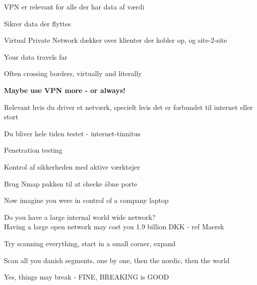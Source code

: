 \documentclass[Screen16to9,17pt]{foils}
\begin{document}


\begin{list2}
\item VPN er relevant for alle der har data af værdi
\item Sikrer data der flyttes
\item Virtual Private Network dækker over klienter der kobler op, og site-2-site
\end{list2}




\begin{list2}
\item Your data travels far
\item Often crossing borders, virtually and literally
\end{list2}

\vskip 5mm
\centerline{\bf\Large Maybe use VPN more - or always!}




\begin{list2}
\item Relevant hvis du driver et netværk, specielt hvis det er forbundet til internet eller stort
\item Du bliver hele tiden testet - internet-tinnitus
\item Penetration testing
\item Kontrol af sikkerheden med aktive værktøjer
\item Brug Nmap pakken til at checke åbne porte
\end{list2}




\begin{list2}
\item Now imagine you were in control of a company laptop
\item Do you have a large internal world wide network?\\
Having a large open network may cost you 1.9 billion DKK - ref Maersk
\item Try scanning everything, start in a small corner, expand
\item Scan all you danish segments, one by one, then the nordic, then the world
\item Yes, things may break - FINE, BREAKING is GOOD
\end{list2}
\end{document}
